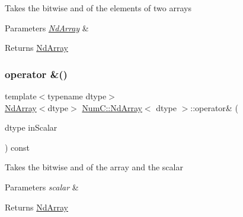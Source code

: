 Takes the bitwise and of the elements of two arrays


\begin{DoxyParams}{Parameters}
{\em \mbox{\hyperlink{class_num_c_1_1_nd_array}{Nd\+Array}}} & \\
\hline
\end{DoxyParams}
\begin{DoxyReturn}{Returns}
\mbox{\hyperlink{class_num_c_1_1_nd_array}{Nd\+Array}} 
\end{DoxyReturn}
\mbox{\label{class_num_c_1_1_nd_array_ad45f32f0f838dd0eba65a867b7066b61}} 
\subsubsection{\texorpdfstring{operator \&()}{operator \&()}\hspace{0.1cm}{\footnotesize\ttfamily [2/2]}}
{\footnotesize\ttfamily template$<$typename dtype$>$ \\
\mbox{\hyperlink{class_num_c_1_1_nd_array}{Nd\+Array}}$<$dtype$>$ \mbox{\hyperlink{class_num_c_1_1_nd_array}{Num\+C\+::\+Nd\+Array}}$<$ dtype $>$\+::operator\& (\begin{DoxyParamCaption}\item[{dtype}]{in\+Scalar }\end{DoxyParamCaption}) const\hspace{0.3cm}{\ttfamily [inline]}}

Takes the bitwise and of the array and the scalar


\begin{DoxyParams}{Parameters}
{\em scalar} & \\
\hline
\end{DoxyParams}
\begin{DoxyReturn}{Returns}
\mbox{\hyperlink{class_num_c_1_1_nd_array}{Nd\+Array}} 
\end{DoxyReturn}
\mbox{\label{class_num_c_1_1_nd_array_ab80433168fc9b6c44e49f68688826802}} 
